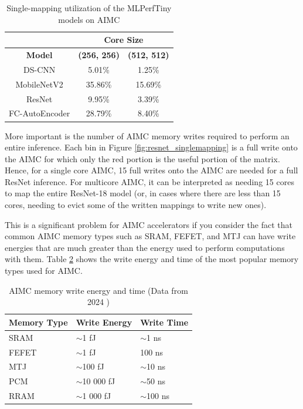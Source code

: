 \begin{table}[h]
\caption{Single-mapping utilization of the MLPerfTiny models on AIMC}
\label{table:single_mapping_utilization}
\centering
\begin{tabular}{ccc}
\cline{2-3}
\multicolumn{1}{c|}{} & \multicolumn{2}{c}{\textbf{Core Size}}    \\ \hline
\textbf{Model}        & \textbf{(256, 256)} & \textbf{(512, 512)} \\ \hline
DS-CNN                & 5.01\%              & 1.25\%              \\
MobileNetV2           & 35.86\%             & 15.69\%             \\
ResNet                & 9.95\%              & 3.39\%              \\
FC-AutoEncoder        & 28.79\%             & 8.40\%             
\end{tabular}%
\end{table}

More important is the number of AIMC memory writes required to perform an entire inference. Each bin in Figure \ref{fig:resnet_singlemapping} is a full write onto the AIMC for which only the red portion is the useful portion of the matrix. Hence, for a single core AIMC, 15 full writes onto the AIMC are needed for a full ResNet inference. For multicore AIMC, it can be interpreted as needing 15 cores to map the entire ResNet-18 model (or, in cases where there are less than 15 cores, needing to evict some of the written mappings to write new ones).

This is a significant problem for AIMC accelerators if you consider the fact that common AIMC memory types such as SRAM, FEFET, and MTJ can have write energies that are much greater than the energy used to perform computations with them. Table \ref{table:aimc_memory_write_energy} shows the write energy and time of the most popular memory types used for AIMC.

\begin{table}[h]
\caption{AIMC memory write energy and time (Data from 2024 \cite{meng2024compute})}
\label{table:aimc_memory_write_energy}
\centering
\begin{tabular}{lll}
\hline
\textbf{Memory Type} & \textbf{Write Energy} & \textbf{Write Time} \\ \hline
SRAM                 & $\sim$1 fJ            & $\sim$1 ns          \\
FEFET                & $\sim$1 fJ            & 100 ns              \\
MTJ                  & $\sim$100 fJ          & $\sim$10 ns         \\
PCM                  & $\sim$10 000 fJ       & $\sim$50 ns         \\
RRAM                 & $\sim$1 000 fJ        & $\sim$100 ns       
\end{tabular}%
\end{table}

